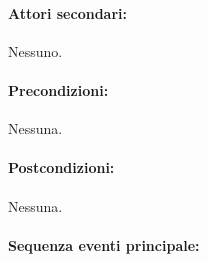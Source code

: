 \documentclass{article}
\begin{document}
	\paragraph{Attori secondari:}Nessuno.
	
	\paragraph{Precondizioni:}Nessuna.
	
	\paragraph{Postcondizioni:}Nessuna.
	
	\paragraph{Sequenza eventi principale:}
\end{document}
